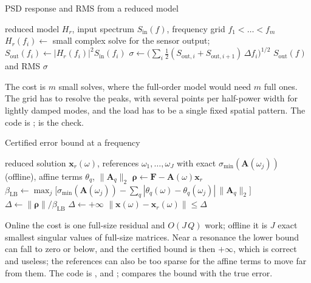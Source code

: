 \begin{algbox}{PSD response and RMS from a reduced model}
\begin{pseudo}
\Require reduced model $H_r$, input spectrum $S_{\mathrm{in}}(f)$, frequency grid $f_1<\dots<f_m$
  \State $H_r(f_i)\gets$ small complex solve for the sensor output;\ $S_{\mathrm{out}}(f_i)\gets|H_r(f_i)|^2S_{\mathrm{in}}(f_i)$
\EndFor
\State $\sigma\gets\big(\sum_i\tfrac12(S_{\mathrm{out},i}+S_{\mathrm{out},i+1})\,\Delta f_i\big)^{1/2}$ 
\Ensure $S_{\mathrm{out}}(f)$ and RMS $\sigma$
\end{pseudo}
\end{algbox}

The cost is $m$ small solves, where the full-order model would need $m$ full ones. The grid has to resolve the peaks, with several points per half-power width for lightly damped modes, and the load has to be a single fixed spatial pattern. The code is ;  is the check.

\begin{algbox}{Certified error bound at a frequency}
\begin{pseudo}
\Require reduced solution $\bm x_r(\omega)$, references $\omega_1,\dots,\omega_J$ with exact $\sigma_{\min}(\bm A(\omega_j))$ (offline), affine terms $\theta_q$, $\|\bm A_q\|_2$
\State $\bm\rho\gets\bm F-\bm A(\omega)\bm x_r$ 
\State $\beta_{\mathrm{LB}}\gets\max_j\big[\sigma_{\min}(\bm A(\omega_j))-\sum_q|\theta_q(\omega)-\theta_q(\omega_j)|\,\|\bm A_q\|_2\big]$ 
 $\Delta\gets\|\bm\rho\|/\beta_{\mathrm{LB}}$ \Else{} $\Delta\gets+\infty$ \EndIf
\Ensure $\|\bm x(\omega)-\bm x_r(\omega)\|\le\Delta$
\end{pseudo}
\end{algbox}

Online the cost is one full-size residual and $O(J\,Q)$ work; offline it is $J$ exact smallest singular values of full-size matrices. Near a resonance the lower bound can fall to zero or below, and the certified bound is then $+\infty$, which is correct and useless; the references can also be too sparse for the affine terms to move far from them. The code is ,  and ;  compares the bound with the true error.

